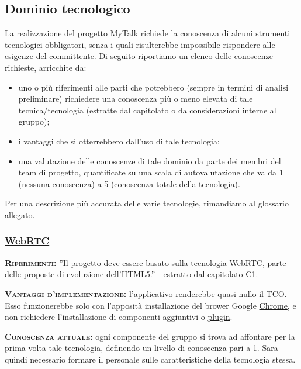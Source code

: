 \subsection{Dominio tecnologico}
La realizzazione del progetto MyTalk richiede la conoscenza di alcuni strumenti tecnologici obbligatori, senza i quali risulterebbe impossibile rispondere alle esigenze del committente. Di seguito riportiamo un elenco delle conoscenze richieste, arricchite da:

\begin{itemize}
	\item uno o più riferimenti alle parti che potrebbero (sempre in termini di analisi preliminare) richiedere una conoscenza più o meno elevata di tale tecnica/tecnologia (estratte dal capitolato o da considerazioni interne al gruppo);
	\item i vantaggi che si otterrebbero dall'uso di tale tecnologia;
	\item una valutazione delle conoscenze di tale dominio da parte dei membri del team di progetto, quantificate su una scala di autovalutazione che va da 1 (nessuna conoscenza) a 5 (conoscenza totale della tecnologia).
\end{itemize}
Per una descrizione più accurata delle varie tecnologie, rimandiamo al glossario allegato.

\subsubsection{\underline{WebRTC}}
\begin{description}
	\item{\scshape\bfseries Riferimenti:} ''Il progetto deve essere basato sulla tecnologia \underline{WebRTC}, parte delle proposte di evoluzione dell'\underline{HTML5}.'' - estratto dal capitolato C1.

	\item{\scshape\bfseries Vantaggi d'implementazione:} l'applicativo renderebbe quasi nullo il TCO. Esso funzionerebbe solo con l'apposità installazione del brower Google \underline{Chrome}, e non richiedere l'installazione di componenti aggiuntivi o \underline{plugin}.
	
	\item{\scshape\bfseries Conoscenza attuale:} ogni componente del gruppo si trova ad affontare per la prima volta tale tecnologia, definendo un livello di conoscenza pari a 1. Sara quindi necessario formare il personale sulle caratteristiche della tecnologia stessa.
\end{description}

